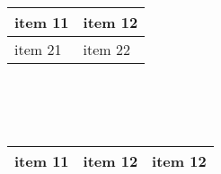 \documentclass[14pt]{extarticle}
\begin{document}
\noindent   %
\begin{tabu} to 1\textwidth { | X[l] | X[] |}
 \hline
 item 11 & item 12\\
 \hline
 item 21  & item 22\\
\hline
\end{tabu}
\\
\\
\\
\begin{tabu} to 1\textwidth { | X[l] | X[c]| X[r]|}
 \hline
 item 11 & item 12  & item 12\\
 \hline
 \end{tabu}
\end{document}

